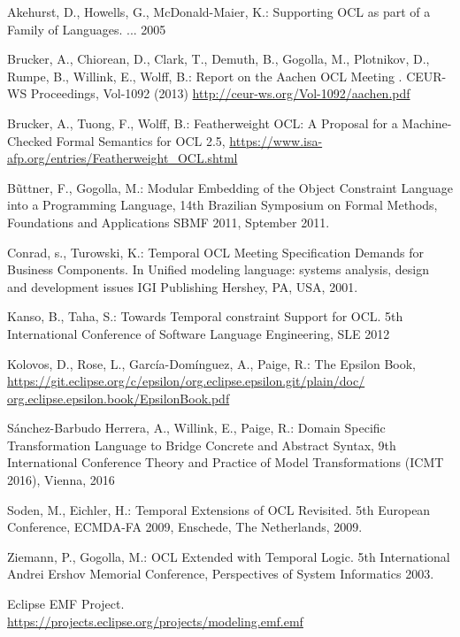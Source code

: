 \documentclass{llncs}
\begin{document}
%
%
\begin{thebibliography}{}
%
Akehurst, D., Howells, G., McDonald-Maier, K.: Supporting OCL as part of a Family of Languages. ... 2005

Brucker, A., Chiorean, D., Clark, T., Demuth, B., Gogolla, M., Plotnikov, D., Rumpe, B., Willink, E., Wolff, B.:
Report on the Aachen OCL Meeting .
CEUR-WS Proceedings, Vol-1092 (2013)
\url{http://ceur-ws.org/Vol-1092/aachen.pdf}

Brucker, A., Tuong, F., Wolff, B.: Featherweight OCL:  A Proposal for a Machine-Checked Formal Semantics for OCL 2.5, \url{https://www.isa-afp.org/entries/Featherweight\_OCL.shtml}

B\~uttner, F., Gogolla, M.: Modular Embedding of the Object Constraint Language into a Programming Language,
14th Brazilian Symposium on Formal Methods, Foundations and Applications SBMF 2011, Sptember 2011.

Conrad, s.,  Turowski, K.: Temporal OCL Meeting Specification Demands for Business Components.
In Unified modeling language: systems analysis, design and development issues IGI Publishing Hershey, PA, USA, 2001.

Kanso, B., Taha, S.: Towards Temporal constraint Support for OCL.
5th International Conference of Software Language Engineering, SLE 2012

Kolovos, D., Rose, L., Garc\'ia-Dom\'inguez, A., Paige, R.: The Epsilon Book, \url{https://git.eclipse.org/c/epsilon/org.eclipse.epsilon.git/plain/doc/
org.eclipse.epsilon.book/EpsilonBook.pdf}

S\'anchez-Barbudo Herrera, A., Willink, E., Paige, R.: Domain Specific Transformation Language to Bridge Concrete and Abstract Syntax,  9th International Conference Theory and Practice of Model Transformations (ICMT 2016), Vienna, 2016 

Soden, M., Eichler, H.: Temporal Extensions of OCL Revisited.
5th European Conference, ECMDA-FA 2009, Enschede, The Netherlands, 2009.

Ziemann, P.,  Gogolla, M.: OCL  Extended  with  Temporal  Logic. 
5th International Andrei Ershov Memorial Conference, Perspectives of System Informatics 2003.

Eclipse EMF Project.\\
\url{https://projects.eclipse.org/projects/modeling.emf.emf}


\end{thebibliography}
\end{document}
